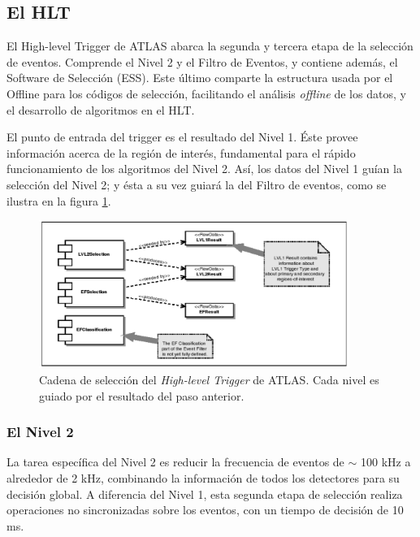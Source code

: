 \subsection{El HLT}

 El High-level Trigger de ATLAS abarca la segunda y tercera etapa de la selecci\'on de eventos. Comprende el Nivel 2 y el Filtro de Eventos, y contiene adem\'as, el Software de Selecci\'on (ESS). Este \'ultimo comparte la estructura usada por el Offline para los c\'odigos de selecci\'on, facilitando el an\'alisis \emph{offline} de los datos, y el desarrollo de algoritmos en el HLT.

   El punto de entrada del trigger es el resultado del Nivel 1. \'Este provee informaci\'on acerca de la regi\'on de inter\'es, fundamental para el r\'apido funcionamiento de los algoritmos del Nivel 2. As\'i, los datos del Nivel 1 gu\'ian la selecci\'on del Nivel 2; y \'esta a su vez guiar\'a la del Filtro de eventos, como se ilustra en la figura \ref{fig:HLTchainseed}. 
\begin{figure}[!h]
\begin{center}
\includegraphics[width=0.9\textwidth]{Fig3/HLTchain_seeding.pdf} 
\caption{Cadena de selecci\'on del \emph{High-level Trigger} de ATLAS. Cada nivel es guiado por el resultado del paso anterior.}
\label{fig:HLTchainseed}
\end{center}
\end{figure}


\subsubsection{El Nivel 2}
   La tarea espec\'ifica del Nivel 2 es reducir la frecuencia de eventos de $\sim$ 100 kHz a alrededor de 2 kHz, combinando la informaci\'on de todos los detectores para su decisi\'on global. A diferencia del Nivel 1, esta segunda etapa de selecci\'on realiza operaciones no sincronizadas sobre los eventos, con un tiempo de decisi\'on de 10 ms.

